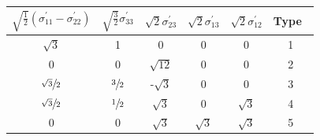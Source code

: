 \documentclass[preprint,3p,times,sort&compress,letterpaper,12pt]{elsarticle} %
\begin{document}
\begin{table}[H]
    \centering
    \begin{tabular}{c c c c c | c}
        $\sqrt{\frac{1}{2}}\left(\sigma^\prime_{11} - \sigma^\prime_{22}\right)$ & $\sqrt{\frac{3}{2}}\sigma^\prime_{33}$ & $\sqrt{2}\sigma^\prime_{23}$ & $\sqrt{2}\sigma^\prime_{13}$ & $\sqrt{2}\sigma^\prime_{12}$ & Type~\cite{Bishop1951} \\
        \hline
        $\sqrt{3}$ & 1 & 0 & 0 & 0 & 1 \\
        0 & 0 & $\sqrt{12}$ & 0 & 0 & 2 \\ 
        $\sfrac{\sqrt{3}}{2}$ & $\sfrac{3}{2}$ & -$\sqrt{3}$ & 0 & 0 & 3 \\
        $\sfrac{\sqrt{3}}{2}$ & $\sfrac{1}{2}$ & $\sqrt{3}$ & 0 & $\sqrt{3}$ & 4 \\
        0 & 0 & $\sqrt{3}$ & $\sqrt{3}$ & $\sqrt{3}$ & 5 \\

\end{tabular}
\end{table}
\end{document}
